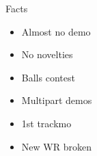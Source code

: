 \documentclass{beamer}
\begin{document}
\begin{frame}
\begin{columns}
\begin{column}{.37\linewidth}
\begin{block}{Facts}
	  \only<4>
	  {
	  \begin{itemize}
	    \item Almost no demo
	    \item No novelties
	    \item Balls contest
	  \end{itemize}
	  }

	  {
	  \begin{itemize}
	    \item Multipart demos
	    \item 1st trackmo
	    \item New WR broken
	  \end{itemize}
	  }
	  \vfill
	\end{block}
      \end{column}

      \begin{column}{.62\linewidth}
	\small

\end{column}
\end{columns}
\end{frame}
\end{document}
